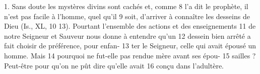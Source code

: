 	1. Sans doute les mystères divins sont cachés et, comme	 
8	 	l'a dit le prophète, il n'est pas facile à l'homme, quel qu'il	 
9	 	soit, d'arriver à connaître les desseins de Dieu (Is., XL,	 
10	 	13). Pourtant l'ensemble des actions et des enseignements	 
11	 	de notre Seigneur et Sauveur nous donne à entendre qu'un	 
12	 	dessein bien arrêté a fait choisir de préférence, pour enfan-	 
13	 	ter le Seigneur, celle qui avait épousé un homme. Mais	 
14	 	pourquoi ne fut-elle pas rendue mère avant ses épou-	 
15	 	sailles ? Peut-être pour qu'on ne pût dire qu'elle avait	 
16	 	conçu dans l'adultère.